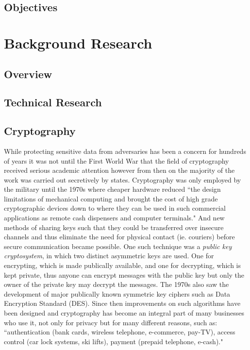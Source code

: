 \documentclass[12pt, titlepage]{article}
\begin{document}
\subsection{Objectives}


\section{Background Research}
\subsection{Overview}

\subsection{Technical Research}
\subsection*{Cryptography}
While protecting sensitive data from adversaries has been a concern for hundreds of years it was not until the First World War that the field of cryptography received serious academic attention however from then on the majority of the work was carried out secretively by states.\cite{appliedCryptoBook} Cryptography was only employed by the military until the 1970s where cheaper hardware reduced ``the design limitations of mechanical computing and brought the cost of high grade cryptographic devices down to where they can be used in such commercial applications as remote cash dispensers and computer terminals."\cite{newCryptoDirections} And new methods of sharing keys such that they could be transferred over insecure channels and thus eliminate the need for physical contact (ie. couriers) before secure communication became possible. One such technique was a \textit{public key cryptosystem}, in which two distinct asymmetric keys are used. One for encrypting, which is made publically available, and one for decrypting, which is kept private, thus anyone can encrypt messages with the public key but only the owner of the private key may decrypt the messages. The 1970s also saw the development of major publically known symmetric key ciphers such as Data Encryption Standard (DES). Since then improvements on such algorithms have been designed and cryptography has become an integral part of many businesses who use it, not only for privacy but for many different reasons, such as: ``authentication (bank cards, wireless telephone, e-commerce, pay-TV), access control (car lock systems, ski lifts), payment (prepaid telephone, e-cash)."\cite{classicalCryptoBook}
\end{document}
